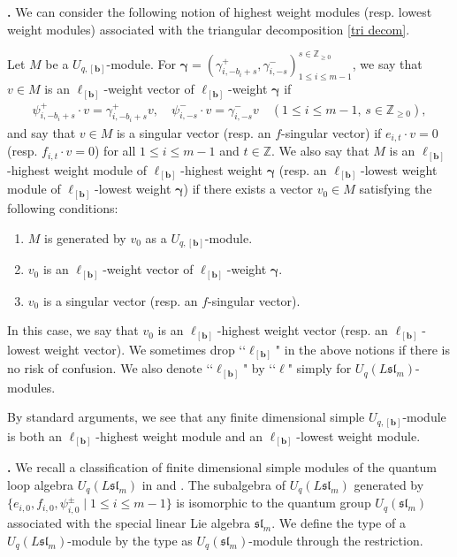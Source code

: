 \documentclass[12pt]{amsart}
\def \para{\refstepcounter{thm} \par\medskip\noindent
                \textbf{\thethm .} }
\numberwithin{equation}{thm}
\newcommand\ZZ{\mathbb Z}
\newcommand\bb{\mathbf b}
\newcommand\g{\gamma}
\newcommand\Bg{\boldsymbol\gamma}
\newcommand\Fsl{\mathfrak{sl}}
\newcounter{ni}
\begin{document}
\para \label{ellbb hw} 
We can consider the following notion of highest weight modules (resp. lowest weight modules) 
associated with the triangular decomposition \ref{tri decom}. 

Let $M$ be a $U_{q,[\bb]}$-module. 
For $\Bg =(\g_{i, - b_i+s}^+, \g_{i, -s}^-)^{s \in \ZZ_{\geq 0}}_{1 \leq i \leq m-1}$, 
we say that $v \in M$ is an $\ell_{[\bb]}$-weight vector of $\ell_{[\bb]}$-weight $\Bg$ if 
\begin{align*}
\psi_{i, - b_i +s}^+ \cdot v = \g_{i, - b_i +s}^+ v, 
\quad 
\psi_{i,-s}^- \cdot v = \g_{i, -s}^- v 
\quad (1\leq i \leq m-1, \, s \in \ZZ_{\geq 0}), 
\end{align*}
and say that $v \in M$ is a singular vector (resp. an $f$-singular vector) 
if $e_{i,t} \cdot v =0$ (resp. $f_{i,t} \cdot v =0$) for all $1\leq i \leq m-1$ and $t \in \ZZ$. 
We also say that 
$M$ is an $\ell_{[\bb]}$-highest weight module of $\ell_{[\bb]}$-highest weight $\Bg$ 
(resp. an $\ell_{[\bb]}$-lowest weight module of $\ell_{[\bb]}$-lowest weight $\Bg$) 
if 
there exists a vector $v_0 \in M$ satisfying the following conditions: 
\begin{enumerate}
\item 
$M$ is generated by $v_0$ as a $U_{q,[\bb]}$-module. 

\item 
$v_0$ is an $\ell_{[\bb]}$-weight vector of $\ell_{[\bb]}$-weight $\Bg$. 

\item 
$v_0$ is a singular vector (resp. an $f$-singular vector). 
\end{enumerate}
In this case, we say that $v_0$ is an $\ell_{[\bb]}$-highest weight vector (resp. an $\ell_{[\bb]}$-lowest weight vector). 
We sometimes drop \lq\lq$\ell_{[\bb]}$" in the above notions if there is no risk of confusion. 
We also denote \lq\lq $\ell_{[\bb]}$" by \lq \lq $\ell$" simply for $U_q (L\Fsl_m)$-modules. 

By standard arguments, 
we see that any finite dimensional simple $U_{q,[\bb]}$-module is both an $\ell_{[\bb]}$-highest weight module 
and an $\ell_{[\bb]}$-lowest weight module. 

\para 
\label{par simple Uq} 
We recall a classification of finite dimensional simple modules of the quantum loop algebra $U_q(L\Fsl_m)$ in 
\cite{CP91} and \cite{CP95}.
The subalgebra of $U_{q}(L\Fsl_m)$ generated by 
$\{e_{i,0}, f_{i,0}, \psi_{i,0}^{\pm} \mid 1 \leq i \leq m-1\}$ is isomorphic to the quantum group 
$U_q(\Fsl_m)$ associated with the special linear Lie algebra $\Fsl_m$. 
We define the type of a $U_q (L\Fsl_m)$-module by the type as $U_q (\Fsl_m)$-module through the restriction. 
\end{document}
